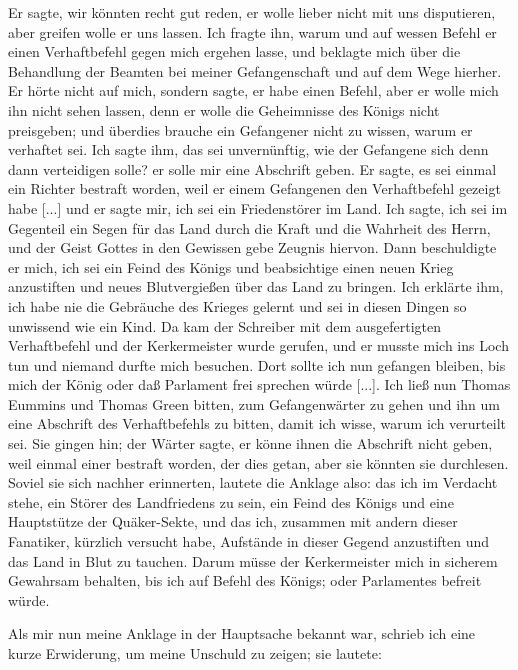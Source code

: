 Er sagte, wir könnten recht gut reden, er wolle
lieber nicht mit uns disputieren, aber greifen wolle er uns lassen. Ich
fragte ihn, warum und auf wessen Befehl er einen Verhaftbefehl
gegen mich ergehen lasse, und beklagte mich über die Behandlung
der Beamten bei meiner Gefangenschaft und auf dem Wege
hierher. Er hörte nicht auf mich, sondern sagte, er habe einen
Befehl, aber er wolle mich ihn nicht sehen lassen, denn er
wolle die Geheimnisse des Königs nicht preisgeben; und überdies 
brauche ein Gefangener nicht zu wissen, warum er verhaftet 
sei. Ich sagte ihm, das sei unvernünftig, wie der Gefangene 
sich denn dann verteidigen solle? er solle mir eine Abschrift
geben. Er sagte, es sei einmal ein Richter bestraft worden, weil
er einem Gefangenen den Verhaftbefehl gezeigt habe [...] und
er sagte mir, ich sei ein Friedenstörer im Land. Ich sagte, ich
sei im Gegenteil ein Segen für das Land durch die Kraft und
die Wahrheit des Herrn, und der Geist Gottes in den Gewissen
gebe Zeugnis hiervon. Dann beschuldigte er mich, ich sei ein
Feind des Königs und beabsichtige einen neuen Krieg anzustiften
und neues Blutvergießen über das Land zu bringen. Ich erklärte
ihm, ich habe nie die Gebräuche des Krieges gelernt und sei in
diesen Dingen so unwissend wie ein Kind. Da kam der Schreiber
mit dem ausgefertigten Verhaftbefehl und der Kerkermeister wurde
gerufen, und er musste mich ins Loch tun und niemand durfte
mich besuchen. Dort sollte ich nun gefangen bleiben, bis mich der
König oder daß Parlament frei sprechen würde [...]. Ich ließ
nun Thomas Eummins und Thomas 
Green bitten, zum Gefangenwärter 
zu gehen und ihn um eine Abschrift des Verhaftbefehls zu
bitten, damit ich wisse, warum ich verurteilt sei. Sie gingen hin;
der Wärter sagte, er könne ihnen die Abschrift nicht geben, weil
einmal einer bestraft worden, der dies getan, aber sie könnten sie
durchlesen. Soviel sie sich nachher erinnerten, lautete die 
Anklage also: das ich im Verdacht stehe, ein Störer des 
Landfriedens zu sein, ein Feind des Königs und eine Hauptstütze der
Quäker-Sekte, und das ich, zusammen mit andern dieser 
Fanatiker, kürzlich versucht habe, Aufstände in dieser Gegend 
anzustiften und das Land in Blut zu tauchen. Darum müsse der
Kerkermeister mich in sicherem Gewahrsam behalten, bis ich auf
Befehl des Königs; oder Parlamentes befreit würde.


Als mir nun meine Anklage in der Hauptsache bekannt war,
schrieb ich eine kurze Erwiderung, um meine Unschuld zu zeigen;
sie lautete:

